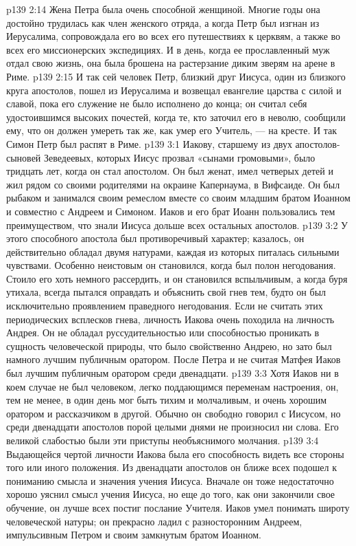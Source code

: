 \vs p139 2:14 \pc Жена Петра была очень способной женщиной. Многие годы она достойно трудилась как член женского отряда, а когда Петр был изгнан из Иерусалима, сопровождала его во всех его путешествиях к церквям, а также во всех его миссионерских экспедициях. И в день, когда ее прославленный муж отдал свою жизнь, она была брошена на растерзание диким зверям на арене в Риме.
\vs p139 2:15 \pc И так сей человек Петр, близкий друг Иисуса, один из близкого круга апостолов, пошел из Иерусалима и возвещал евангелие царства с силой и славой, пока его служение не было исполнено до конца; он считал себя удостоившимся высоких почестей, когда те, кто заточил его в неволю, сообщили ему, что он должен умереть так же, как умер его Учитель, --- на кресте. И так Симон Петр был распят в Риме.
\vs p139 3:1 Иакову, старшему из двух апостолов\hyp{}сыновей Зеведеевых, которых Иисус прозвал «сынами громовыми», было тридцать лет, когда он стал апостолом. Он был женат, имел четверых детей и жил рядом со своими родителями на окраине Капернаума, в Вифсаиде. Он был рыбаком и занимался своим ремеслом вместе со своим младшим братом Иоанном и совместно с Андреем и Симоном. Иаков и его брат Иоанн пользовались тем преимуществом, что знали Иисуса дольше всех остальных апостолов.
\vs p139 3:2 \pc У этого способного апостола был противоречивый характер; казалось, он действительно обладал двумя натурами, каждая из которых питалась сильными чувствами. Особенно неистовым он становился, когда был полон негодования. Стоило его хоть немного рассердить, и он становился вспыльчивым, а когда буря утихала, всегда пытался оправдать и объяснить свой гнев тем, будто он был исключительно проявлением праведного негодования. Если не считать этих периодических всплесков гнева, личность Иакова очень походила на личность Андрея. Он не обладал руссудительностью или способностью проникать в сущность человеческой природы, что было свойственно Андрею, но зато был намного лучшим публичным оратором. После Петра и не считая Матфея Иаков был лучшим публичным оратором среди двенадцати.
\vs p139 3:3 Хотя Иаков ни в коем случае не был человеком, легко поддающимся переменам настроения, он, тем не менее, в один день мог быть тихим и молчаливым, и очень хорошим оратором и рассказчиком в другой. Обычно он свободно говорил с Иисусом, но среди двенадцати апостолов порой целыми днями не произносил ни слова. Его великой слабостью были эти приступы необъяснимого молчания.
\vs p139 3:4 Выдающейся чертой личности Иакова была его способность видеть все стороны того или иного положения. Из двенадцати апостолов он ближе всех подошел к пониманию смысла и значения учения Иисуса. Вначале он тоже недостаточно хорошо уяснил смысл учения Иисуса, но еще до того, как они закончили свое обучение, он лучше всех постиг послание Учителя. Иаков умел понимать широту человеческой натуры; он прекрасно ладил с разносторонним Андреем, импульсивным Петром и своим замкнутым братом Иоанном.
